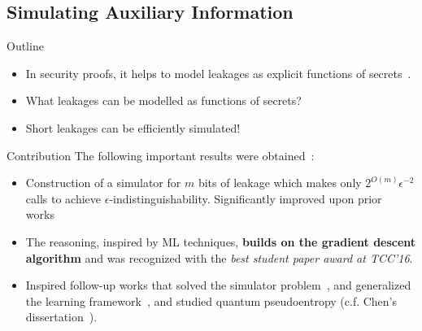 \documentclass[9pt]{beamer}					%
\begin{document}
\subsection{Simulating Auxiliary Information }

\begin{frame}{Outline}
\begin{itemize}
\item[\emoji{open-book}] In security proofs, it helps to model leakages as explicit functions of secrets~\cite{DBLP:conf/tcc/JetchevP14}.
\item[\emoji{question}] What leakages can be modelled as functions of secrets?
\item[\emoji{raised-hand}] Short leakages can be efficiently simulated!
\end{itemize}
\end{frame}

\begin{frame}{Contribution}
The following important results were obtained~\cite{skorski2016simulating}:
\begin{itemize}
\item[\emoji{key}] Construction of a simulator for $m$ bits of leakage which makes only $2^{O(m)}\epsilon^{-2}$ calls to achieve $\epsilon$-indistinguishability. Significantly improved upon prior works~\cite{DBLP:conf/crypto/VadhanZ13,DBLP:conf/tcc/JetchevP14}
\item[\emoji{trophy}] The reasoning, inspired by ML techniques, \textbf{builds on the gradient descent algorithm} and was recognized with the \emph{best student paper award at TCC'16}.
\item[\emoji{fire}] Inspired follow-up works that solved the simulator problem~\cite{Chen_2018}, and generalized the learning framework~\cite{skorski2016subgradient,skorskiapproximating}, and studied quantum pseudoentropy (c.f. Chen's dissertation~\cite{chen2019computational}). 
\end{itemize}
\end{frame}
\end{document}
